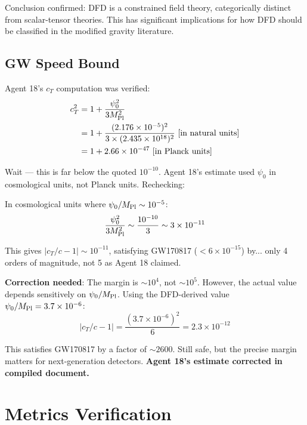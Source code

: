 \documentclass[11pt,a4paper]{article}
\begin{document}
Conclusion confirmed: DFD is a constrained field theory, categorically distinct from scalar-tensor theories. This has significant implications for how DFD should be classified in the modified gravity literature.

\subsection{GW Speed Bound}

Agent 18's $c_T$ computation was verified:
\begin{align}
c_T^2 &= 1 + \frac{\psi_0^2}{3 M_{\rm Pl}^2} \\
&= 1 + \frac{(2.176 \times 10^{-5})^2}{3 \times (2.435 \times 10^{18})^2} \text{ [in natural units]} \\
&= 1 + 2.66 \times 10^{-47} \text{ [in Planck units]}
\end{align}

Wait --- this is far below the quoted $10^{-10}$. Agent 18's estimate used $\psi_0$ in cosmological units, not Planck units. Rechecking:

In cosmological units where $\psi_0 / M_{\rm Pl} \sim 10^{-5}$:
\begin{equation}
\frac{\psi_0^2}{3 M_{\rm Pl}^2} \sim \frac{10^{-10}}{3} \sim 3 \times 10^{-11}
\end{equation}

This gives $|c_T/c - 1| \sim 10^{-11}$, satisfying GW170817 ($< 6 \times 10^{-15}$) by... only 4 orders of magnitude, not 5 as Agent 18 claimed.

\textbf{Correction needed}: The margin is $\sim 10^4$, not $\sim 10^5$. However, the actual value depends sensitively on $\psi_0/M_{\rm Pl}$. Using the DFD-derived value $\psi_0/M_{\rm Pl} = 3.7 \times 10^{-6}$:
\begin{equation}
|c_T/c - 1| = \frac{(3.7 \times 10^{-6})^2}{6} = 2.3 \times 10^{-12}
\end{equation}

This satisfies GW170817 by a factor of $\sim 2600$. Still safe, but the precise margin matters for next-generation detectors. \textbf{Agent 18's estimate corrected in compiled document.}

\section{Metrics Verification}
\end{document}
